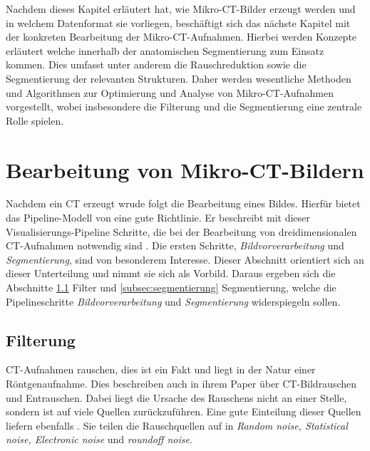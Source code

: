 Nachdem dieses Kapitel erläutert hat, wie Mikro-\ac{CT}-Bilder erzeugt werden und
in welchem Datenformat sie vorliegen, beschäftigt sich das nächste Kapitel mit
der konkreten Bearbeitung der Mikro-\ac{CT}-Aufnahmen. Hierbei werden Konzepte
erläutert welche innerhalb der anatomischen Segmentierung zum Einsatz kommen. Dies
umfasst unter anderem die Rauschreduktion sowie die Segmentierung der relevanten
Strukturen. Daher werden wesentliche Methoden und Algorithmen zur Optimierung
und Analyse von Mikro-\ac{CT}-Aufnahmen vorgestellt, wobei insbesondere die
Filterung und die Segmentierung eine zentrale Rolle spielen.

\pagebreak

\section{Bearbeitung von Mikro-CT-Bildern}
\label{sec:bildbearbeitung} Nachdem ein \ac{CT} erzeugt wrude folgt die
Bearbeitung eines Bildes. Hierfür bietet das Pipeline-Modell von \citet[S.~50]{handels2000}
eine gute Richtlinie. Er beschreibt mit dieser Visualisierungs-Pipeline Schritte,
die bei der Bearbeitung von dreidimensionalen \ac{CT}-Aufnahmen notwendig sind \citep[vgl.][S.~50]{handels2000}.
Die ersten Schritte, \textit{Bildvorverarbeitung} und \textit{Segmentierung}, sind
von besonderem Interesse. Dieser Abschnitt orientiert sich an dieser
Unterteilung und nimmt sie sich als Vorbild. Daraus ergeben sich die Abschnitte \ref{subsec:filter}
Filter und \ref{subsec:segmentierung} Segmentierung, welche die Pipelineschritte
\textit{Bildvorverarbeitung} und \textit{Segmentierung} widerspiegeln sollen.

\subsection{Filterung}
\label{subsec:filter} \ac{CT}-Aufnahmen rauschen, dies ist ein Fakt und liegt in
der Natur einer Röntgenaufnahme. Dies beschreiben auch \citet[K.~3]{diwakar2018}
in ihrem Paper über \ac{CT}-Bildrauschen und Entrauschen. Dabei liegt die
Ursache des Rauschens nicht an einer Stelle, sondern ist auf viele Quellen zurückzuführen.
Eine gute Einteilung dieser Quellen liefern ebenfalls \citet[K.~3]{diwakar2018}.
Sie teilen die Rauschquellen auf in \textit{Random noise, Statistical noise,
Electronic noise} und \textit{roundoff noise}.

